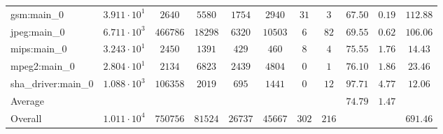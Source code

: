 \begin{tabular}{|l|c|c|c|c|c|c|c|c|c|c|}
gsm:main\_0             & $ 3.911 \cdot 10^{1} $ & $ 2640   $ & $ 5580  $ & $ 1754  $ & $ 2940  $ & $ 31  $ & $ 3   $ & $ 67.50       $ & $ 0.19    $ & $ 112.88  $ \\
jpeg:main\_0            & $ 6.711 \cdot 10^{3} $ & $ 466786 $ & $ 18298 $ & $ 6320  $ & $ 10503 $ & $ 6   $ & $ 82  $ & $ 69.55       $ & $ 0.62    $ & $ 106.06  $ \\
mips:main\_0            & $ 3.243 \cdot 10^{1} $ & $ 2450   $ & $ 1391  $ & $ 429   $ & $ 460   $ & $ 8   $ & $ 4   $ & $ 75.55       $ & $ 1.76    $ & $ 14.43   $ \\
mpeg2:main\_0           & $ 2.804 \cdot 10^{1} $ & $ 2134   $ & $ 6823  $ & $ 2439  $ & $ 4804  $ & $ 0   $ & $ 1   $ & $ 76.10       $ & $ 1.86    $ & $ 23.46   $ \\
sha\_driver:main\_0     & $ 1.088 \cdot 10^{3} $ & $ 106358 $ & $ 2019  $ & $ 695   $ & $ 1441  $ & $ 0   $ & $ 12  $ & $ 97.71       $ & $ 4.77    $ & $ 12.06   $ \\
\hline
Average                 & $                    $ & $        $ & $       $ & $       $ & $       $ & $     $ & $     $ & $ 74.79       $ & $ 1.47    $ & $         $ \\
\hline
Overall                 & $ 1.011 \cdot 10^{4} $ & $ 750756 $ & $ 81524 $ & $ 26737 $ & $ 45667 $ & $ 302 $ & $ 216 $ & $             $ & $         $ & $ 691.46  $ \\
\hline
\end{tabular}
